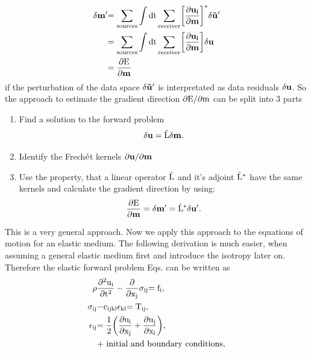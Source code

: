\begin{equation}
\begin{split}
\rm{\delta \mathbf{m'}} &\rm{=  \sum_{sources} \int dt \sum_{receiver} \biggl[\frac{\partial \mathbf{u_i}}{\partial \mathbf{m}}\biggr]^*
\delta \mathbf{\tilde{u}}'} \\
                   &\rm{=  \sum_{sources} \int dt \sum_{receiver} \biggl[\frac{\partial \mathbf{u_i}}{\partial \mathbf{m}}\biggr] \delta \mathbf{u}} \\
                   &\rm{=  \frac{\partial E}{\partial \mathbf{m}}}
\end{split}
\label{dm_dE_dm}
\end{equation}
if the perturbation of the data space $\rm{\delta \mathbf{\tilde{u}}'}$ is interpretated as data residuals $\rm{\delta \mathbf{u}}$. So the approach to estimate the gradient direction $\rm{\partial E/\partial m}$ can be split into 3 parts
\begin{enumerate}
\item Find a solution to the forward problem
\begin{equation}
\rm{\delta \mathbf{u} = \hat{L} \delta \mathbf{m}.\notag}
\end{equation} 
\item Identify the Frech$\rm{\acute{e}}$t kernels $\rm{\partial \mathbf{u}/\partial \mathbf{m}}$ 
\item Use the property, that a linear operator $\rm{\hat{L}}$ and it's adjoint $\rm{\hat{L}^*}$ have the same kernels and calculate the gradient direction by using:
\begin{equation}
\rm{\frac{\partial E}{\partial \mathbf{m}} = \delta \mathbf{m'} = \hat{L}^* \delta \mathbf{u}'. \notag}
\end{equation} 
\end{enumerate}
This is a very general approach. Now we apply this approach to the equations of motion for an elastic medium. The following derivation is much easier, when assuming a general elastic medium first and introduce the isotropy later on. Therefore the elastic forward problem Eqs.  can be written as 
\begin{equation}
\begin{split}
\rm{\rho} & \rm{\frac{\partial^2 u_i}{\partial t^2} - \frac{\partial}{\partial x_j} \sigma_{ij}} \rm{=f_i,} \\
\rm{\sigma_{ij}} & \rm{- c_{ijkl} \epsilon_{kl}} \rm{= T_{ij},}\\
\rm{\epsilon_{ij}} &\rm{= \frac{1}{2} \biggl(\frac{\partial u_i}{\partial x_j}+\frac{\partial u_j}{\partial x_i}\biggr),}\\
&\rm{\text{+ initial and boundary conditions},}\\
\label{2:1}
\end{split}
\end{equation}
